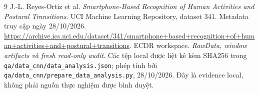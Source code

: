 \documentclass[11pt,a4paper]{article}
\newcommand{\code}[1]{{\small\ttfamily\nolinkurl{#1}}}
\theoremstyle{definition}
\begin{document}
\begin{thebibliography}{9}
 J.-L. Reyes-Ortiz et al. \emph{Smartphone-Based Recognition of
Human Activities and Postural Transitions}. UCI Machine Learning Repository,
dataset 341. Metadata truy cập ngày 28/10/2026.
\url{https://archive.ics.uci.edu/dataset/341/smartphone+based+recognition+of+human+activities+and+postural+transitions}.
 ECDR workspace. \emph{RawData, window artifacts và fresh
read-only audit}. Các tệp local được liệt kê kèm SHA256 trong
\code{qa/data_cnn/data_analysis.json}; phép tính bởi
\code{qa/data_cnn/prepare_data_analysis.py}, 28/10/2026. Đây là evidence
local, không phải nguồn thực nghiệm được bình duyệt.
\end{thebibliography}
\end{document}
